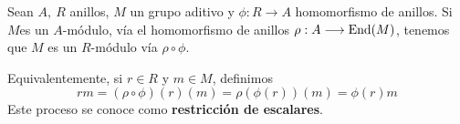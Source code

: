 \begin{prop}
  Sean \(A,\ R\) anillos, \(M\) un grupo aditivo y \(\phi:R\longrightarrow A\)
  homomorfismo de anillos. Si \(M\)es un \(A\)-módulo, vía el homomorfismo de anillos
  \(\rho : A \longrightarrow \operatorname{End}(M)\), tenemos que \(M\) es un \(R\)-módulo
  vía \(\rho \circ \phi\).

  Equivalentemente, si \(r\in R\) y \(m\in M\), definimos
  \[
    rm=(\rho\circ\phi)(r)(m)=\rho(\phi(r))(m)=\phi(r)m
  \]
  Este proceso se conoce como \textbf{restricción de escalares}.
\end{prop}

